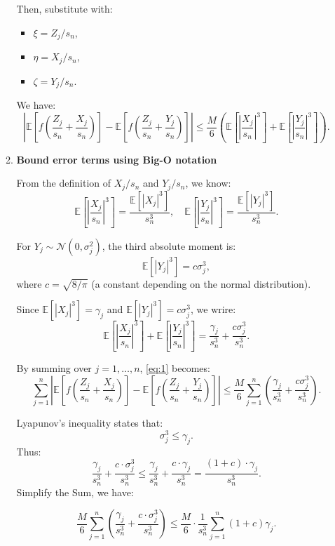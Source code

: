 \begin{itemize}
\begin{enumerate}
Then, substitute with:
\begin{itemize}
    \item \( \xi = Z_j / s_n \),
    \item \( \eta = X_j / s_n \),
    \item \( \zeta = Y_j / s_n \).
\end{itemize}
We have:
   \begin{equation} \label{eq:1}
       \left| \mathbb{E}\left[f\left(\frac{Z_j}{s_n} + \frac{X_j}{s_n}\right)\right] - \mathbb{E}\left[f\left(\frac{Z_j}{s_n} + \frac{Y_j}{s_n}\right)\right] \right| \leq \frac{M}{6} \left( \mathbb{E}\left[\left| \frac{X_j}{s_n} \right|^3\right] + \mathbb{E}\left[\left| \frac{Y_j}{s_n} \right|^3\right] \right).
   \end{equation}
   
\item \textbf{Bound error terms using Big-O notation}

From the definition of \( X_j / s_n \) and \( Y_j / s_n \), we know:
     \[
     \mathbb{E}\left[\left|\frac{X_j}{s_n}\right|^3\right] = \frac{\mathbb{E}[|X_j|^3]}{s_n^3}, \quad \mathbb{E}\left[\left|\frac{Y_j}{s_n}\right|^3\right] = \frac{\mathbb{E}[|Y_j|^3]}{s_n^3}.
     \]

For \( Y_j \sim \mathcal{N}(0, \sigma_j^2) \), the third absolute moment is:
     \[
     \mathbb{E}[|Y_j|^3] = c \sigma_j^3,
     \]
     where \( c = \sqrt{8 / \pi} \) (a constant depending on the normal distribution).

Since \( \mathbb{E}[|X_j|^3] = \gamma_j \) and \(\mathbb{E}[|Y_j|^3] = c \sigma_j^3\), we wrire:
     \[
   \mathbb{E}\left[\left|\frac{X_j}{s_n}\right|^3\right] + \mathbb{E}\left[\left|\frac{Y_j}{s_n}\right|^3\right] = \frac{\gamma_j}{s_n^3} + \frac{c \sigma_j^3}{s_n^3}.
   \]

By summing over \(j = 1, \dots , n\), \eqref{eq:1} becomes:
\[
\sum_{j=1}^n \left| \mathbb{E}\left[f\left(\frac{Z_j}{s_n} + \frac{X_j}{s_n}\right)\right] - \mathbb{E}\left[f\left(\frac{Z_j}{s_n} + \frac{Y_j}{s_n}\right)\right] \right| \leq \frac{M}{6} \sum_{j=1}^n \left( \frac{\gamma_j}{s_n^3} + \frac{c \sigma_j^3}{s_n^3} \right).
\]

Lyapunov's inequality states that:
\[
\sigma_j^3 \leq \gamma_j.
\]
Thus:
\[
\frac{\gamma_j}{s_n^3} + \frac{c \cdot \sigma_j^3}{s_n^3} \leq \frac{\gamma_j}{s_n^3} + \frac{c \cdot \gamma_j}{s_n^3} = \frac{(1 + c) \cdot \gamma_j}{s_n^3}.
\]
Simplify the Sum, we have:

\begin{equation} \label{eq:2}
\frac{M}{6} \sum_{j=1}^n \left( \frac{\gamma_j}{s_n^3} + \frac{c \cdot \sigma_j^3}{s_n^3} \right) \leq \frac{M}{6} \cdot \frac{1}{s_n^3} \sum_{j=1}^n (1 + c) \gamma_j.
\end{equation}


\end{enumerate}
\end{itemize}
